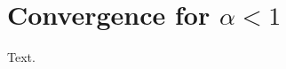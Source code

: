 \documentclass{article}
\begin{document}
\section{Convergence for \texorpdfstring{$\alpha < 1$}{alpha < 1}}
Text.
\end{document}
